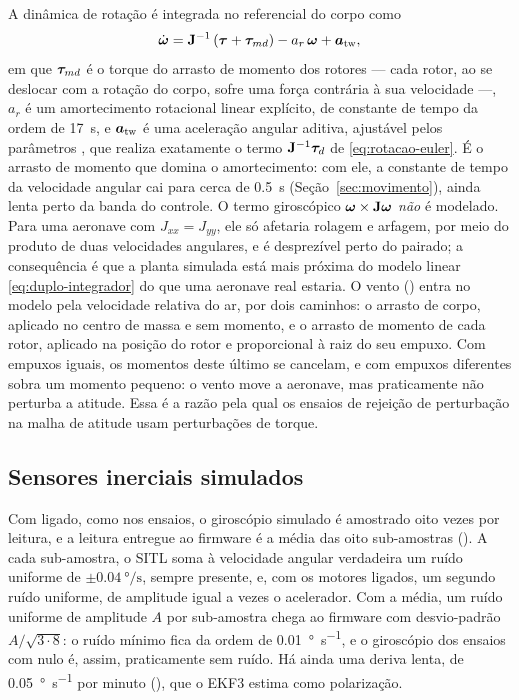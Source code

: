 A dinâmica de rotação é integrada no referencial do corpo como
\begin{equation}
\dot{\bm{\omega}} = \mathbf{J}^{-1}\left(\bm{\tau} + \bm{\tau}_{md}\right)
                     - a_r\,\bm{\omega} + \bm{a}_{\mathrm{tw}},
\label{eq:rotacao-sitl}
\end{equation}
em que $\bm{\tau}_{md}$ é o torque do arrasto de momento dos rotores ---
cada rotor, ao se deslocar com a rotação do corpo, sofre uma força contrária à
sua velocidade ---, $a_r$ é um amortecimento rotacional linear explícito, de
constante de tempo da ordem de \SI{17}{\second}, e
$\bm{a}_{\mathrm{tw}}$ é uma aceleração angular aditiva, ajustável pelos
parâmetros , que realiza exatamente o termo
$\mathbf{J}^{-1}\bm{\tau}_d$ de \eqref{eq:rotacao-euler}. É o arrasto de
momento que domina o amortecimento: com ele, a constante de tempo da
velocidade angular cai para cerca de \SI{0.5}{\second}
(Seção~\ref{sec:movimento}), ainda lenta perto da banda do controle. O termo
giroscópico $\bm{\omega}\times\mathbf{J}\bm{\omega}$ \emph{não} é
modelado. Para uma aeronave com $J_{xx} = J_{yy}$, ele só afetaria rolagem e
arfagem, por meio do produto de duas velocidades angulares, e é desprezível
perto do pairado; a consequência é que a planta simulada está mais próxima do
modelo linear \eqref{eq:duplo-integrador} do que uma aeronave real estaria. O
vento () entra no modelo pela velocidade relativa do ar,
por dois caminhos: o arrasto de corpo, aplicado no centro de massa e sem
momento, e o arrasto de momento de cada rotor, aplicado na posição do rotor e
proporcional à raiz do seu empuxo. Com empuxos iguais, os momentos deste
último se cancelam, e com empuxos diferentes sobra um momento pequeno: o vento
move a aeronave, mas praticamente não perturba a atitude. Essa é a razão pela
qual os ensaios de rejeição de perturbação na malha de atitude usam
perturbações de torque.

\subsection{Sensores inerciais simulados}
\label{sec:sensores-sitl}

Com  ligado, como nos ensaios, o giroscópio
simulado é amostrado oito vezes por leitura, e a leitura entregue ao firmware
é a média das oito sub-amostras (). A
cada sub-amostra, o SITL soma à velocidade angular verdadeira um ruído
uniforme de $\pm\SI{0.04}{\degree\per\second}$, sempre presente, e, com os
motores ligados, um segundo ruído uniforme, de amplitude igual a
 vezes o acelerador. Com a média, um ruído uniforme de
amplitude $A$ por sub-amostra chega ao firmware com desvio-padrão
$A/\sqrt{3 \cdot 8}$: o ruído mínimo fica da ordem de
\SI{0.01}{\degree\per\second}, e o giroscópio dos ensaios com
 nulo é, assim, praticamente sem ruído. Há ainda uma
deriva lenta, de \SI{0.05}{\degree\per\second} por minuto
(), que o EKF3 estima como polarização.

